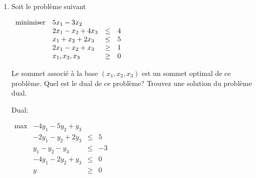 \begin{enumerate}
  \item Soit le problème suivant

    $
    \begin{array}{llcr}
      \mbox{minimiser} & 5x_1-3x_2\\
      & 2x_1-x_2 +4x_3 & \leq & 4\\
      & x_1+x_2 +2x_3 & \leq & 5\\
      & 2x_1-x_2 +x_3 & \geq & 1\\
      & x_1, x_2, x_3 & \geq & 0
    \end{array}
    $

    Le sommet associé à la base $(x_1, x_2, x_3)$ est un sommet optimal de ce problème. Quel est le dual de ce problème? Trouvez une solution du problème dual.


    \begin{solution}
      Dual:

      $
      \begin{array}{llcr}
        \max & -4y_{1} - 5y_{2} + y_{3}\\
        & -2y_{1} - y_{2}  + 2y_{3} & \leq & 5\\
        & y_{1} - y_{2}  -y_{3} & \leq & -3\\
        & -4y_{1} - 2y_{2}  + y_{3} & \leq & 0\\
        & y & \geq & 0
      \end{array}
      $


\end{solution}
\end{enumerate}
